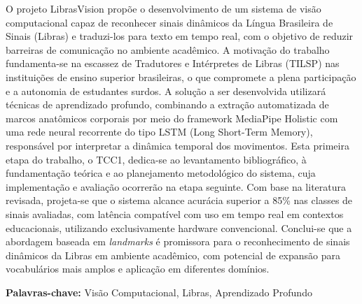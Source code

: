 \documentclass[
	10pt,				%
	openany,
    twoside,			%
	a4paper,			%
    chapter={TITLE},
    section={TITLE},
    subsection={TITLE},
    subsubsection={TITLE},
	english,			%
	french,				%
	spanish,			%
	brazil,				%
	sumario=tradicional
]{abntex2}
\begin{document}
\newpage
\begin{resumo2}
O projeto LibrasVision propõe o desenvolvimento de um sistema de visão computacional capaz de reconhecer sinais dinâmicos da Língua Brasileira de Sinais (Libras) e traduzi-los para texto em tempo real, com o objetivo de reduzir barreiras de comunicação no ambiente acadêmico. A motivação do trabalho fundamenta-se na escassez de Tradutores e Intérpretes de Libras (TILSP) nas instituições de ensino superior brasileiras, o que compromete a plena participação e a autonomia de estudantes surdos. A solução a ser desenvolvida utilizará técnicas de aprendizado profundo, combinando a extração automatizada de marcos anatômicos corporais por meio do framework MediaPipe Holistic com uma rede neural recorrente do tipo LSTM (Long Short-Term Memory), responsável por interpretar a dinâmica temporal dos movimentos. Esta primeira etapa do trabalho, o TCC1, dedica-se ao levantamento bibliográfico, à fundamentação teórica e ao planejamento metodológico do sistema, cuja implementação e avaliação ocorrerão na etapa seguinte. Com base na literatura revisada, projeta-se que o sistema alcance acurácia superior a 85\% nas classes de sinais avaliadas, com latência compatível com uso em tempo real em contextos educacionais, utilizando exclusivamente hardware convencional. Conclui-se que a abordagem baseada em \textit{landmarks} é promissora para o reconhecimento de sinais dinâmicos da Libras em ambiente acadêmico, com potencial de expansão para vocabulários mais amplos e aplicação em diferentes domínios.
 
\vspace*{20pt}
\textbf{Palavras-chave:} Visão Computacional, Libras, Aprendizado Profundo
\end{resumo2}
\end{document}
